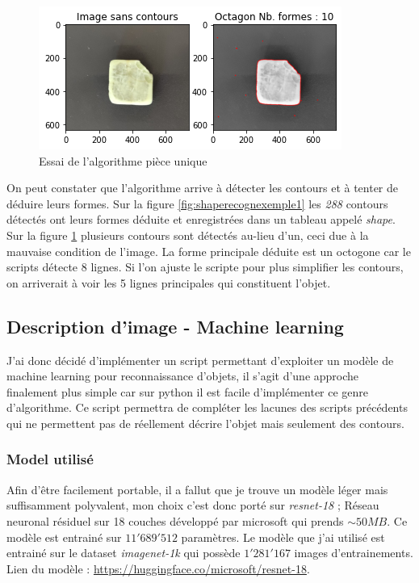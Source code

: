 	\begin{figure}[h]
		\centering
		\includegraphics[width=0.8\linewidth]{Figures/ShapeRecogn_Exemple2}
		\caption{Essai de l'algorithme pièce unique}
		\label{fig:shaperecognexemple2}
	\end{figure}
	
	On peut constater que l'algorithme arrive à détecter les contours et à tenter de déduire leurs formes. Sur la figure \ref{fig:shaperecognexemple1} les \textit{288} contours détectés ont leurs formes déduite et enregistrées dans un tableau appelé \textit{shape}. Sur la figure \ref{fig:shaperecognexemple2} plusieurs contours sont détectés au-lieu d'un, ceci due à la mauvaise condition de l'image. La forme principale déduite est un octogone car le scripts détecte 8 lignes. Si l'on ajuste le scripte pour plus simplifier les contours, on arriverait à voir les 5 lignes principales qui constituent l'objet.

\clearpage	
\subsection{Description d'image - Machine learning}
J'ai donc décidé d'implémenter un script permettant d'exploiter un modèle de machine learning pour reconnaissance d'objets, il s'agit d'une approche finalement plus simple car sur python il est facile d'implémenter ce genre d'algorithme. Ce script permettra de compléter les lacunes des scripts précédents qui ne permettent pas de réellement décrire l'objet mais seulement des contours.

\subsubsection{Model utilisé}
Afin d'être facilement portable, il a fallut que je trouve un modèle léger mais suffisamment polyvalent, mon choix c'est donc porté sur \textit{resnet-18} ; Réseau neuronal résiduel sur 18 couches développé par microsoft qui prends $\sim 50MB$. Ce modèle est entrainé sur $11'689'512$ paramètres. Le modèle que j'ai utilisé est entrainé sur le dataset \textit{imagenet-1k} qui possède $1'281'167$ images d'entrainements.
Lien du modèle : \href{https://huggingface.co/microsoft/resnet-18}{https://huggingface.co/microsoft/resnet-18}. 

